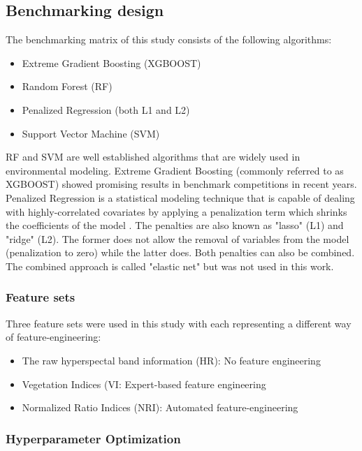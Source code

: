 \documentclass[review]{elsarticle}
\begin{document}
\subsection{Benchmarking design}

\noindent The benchmarking matrix of this study consists of the following algorithms:

\begin{itemize}
	\item  Extreme Gradient Boosting (XGBOOST)
	\item  Random Forest (RF)
	\item  Penalized Regression (both L1 and L2)
	\item  Support Vector Machine (SVM)
\end{itemize}


\noindent \ac{RF} and {SVM} are well established algorithms that are widely used in environmental modeling.
Extreme Gradient Boosting (commonly referred to as \ac{XGBOOST}) showed promising results in benchmark competitions in recent years.
Penalized Regression is a statistical modeling technique that is capable of dealing with highly-correlated covariates by applying a penalization term which shrinks the coefficients of the model \citep{hastie2001}.
The penalties are also known as "lasso" (L1) and "ridge" (L2).
The former does not allow the removal of variables from the model (penalization to zero) while the latter does.
Both penalties can also be combined.
The combined approach is called "elastic net" but was not used in this work.

\subsubsection{Feature sets}

\noindent Three feature sets were used in this study with each representing a different way of feature-engineering:

\begin{itemize}
  \item The raw hyperspectal band information (HR): No feature engineering
  \item Vegetation Indices (\ac{VI}: Expert-based feature engineering
  \item Normalized Ratio Indices (\ac{NRI}): Automated feature-engineering
\end{itemize}

\subsubsection{Hyperparameter Optimization}
\end{document}
